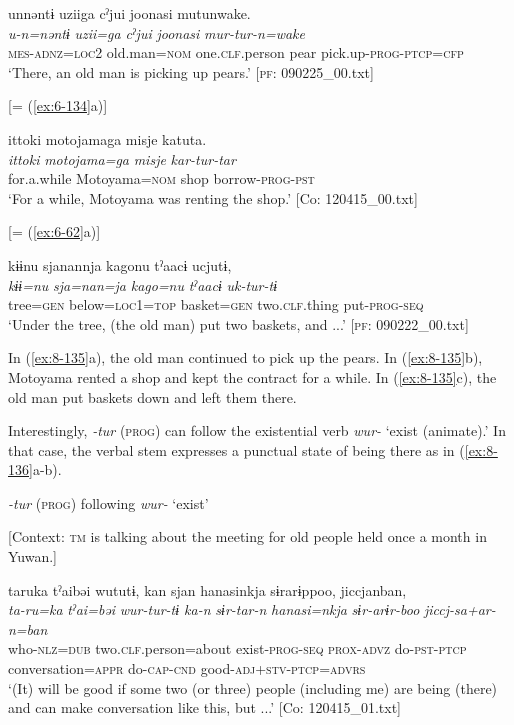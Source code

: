 \ea
{\TM}
\glll  unnəntɨ  uziiga  cˀjui  joonasi      mutunwake.\\
\textit{u-n=nəntɨ}  \textit{uzii=ga}  \textit{cˀjui}  \textit{joonasi}      \textit{mur-tur-n=wake}\\
\textsc{mes}-\textsc{adnz}=\textsc{loc}2  old.man=\textsc{nom}  one.\textsc{clf}.person  pear  pick.up-\textsc{prog}-\textsc{ptcp}=\textsc{cfp}\\
\glt ‘There, an old man is picking up pears.’ [\textsc{pf}: 090225\_00.txt]

\ex {}[= (\ref{ex:6-134}a)]

{\TM}
\glll  {\textbar}ittoki{\textbar}  motojamaga  misje  katuta.\\
\textit{ittoki}  \textit{motojama=ga}  \textit{misje}  \textit{kar-tur-tar}\\
for.a.while  Motoyama=\textsc{nom}  shop  borrow-\textsc{prog}-\textsc{pst}\\
\glt ‘For a while, Motoyama was renting the shop.’ [Co: 120415\_00.txt]

\ex {}[= (\ref{ex:6-62}a)]

{\TM}
\glll  kɨɨnu  sjanannja  kagonu  tˀaacɨ  ucjutɨ,\\
\textit{kɨɨ=nu}  \textit{sja=nan=ja}  \textit{kago=nu}  \textit{tˀaacɨ}  \textit{uk-tur-tɨ}\\
tree=\textsc{gen}  below=\textsc{loc1}=\textsc{top}  basket=\textsc{gen}  two.\textsc{clf}.thing  put-\textsc{prog}-\textsc{seq}\\
\glt ‘Under the tree, (the old man) put two baskets, and ...’ [\textsc{pf}: 090222\_00.txt]
\z
\z

In (\ref{ex:8-135}a), the old man continued to pick up the pears. In (\ref{ex:8-135}b), Motoyama rented a shop and kept the contract for a while. In (\ref{ex:8-135}c), the old man put baskets down and left them there.

  Interestingly, \textit{-tur} (\textsc{prog}) can follow the existential verb \textit{wur-} ‘exist (animate).’ In that case, the verbal stem expresses a punctual state of being there as in (\ref{ex:8-136}a-b).

\ea\label{ex:8-136}
  \textit{-tur} (\textsc{prog}) following \textit{wur-} ‘exist’

\ea {}[Context: \textsc{tm} is talking about the meeting for old people held once a month in Yuwan.]

{\TM}
\glll  taruka  tˀaibəi  wututɨ,  kan    sjan  hanasinkja  sɨrarɨppoo,  jiccjanban,\\
\textit{ta-ru=ka}  \textit{tˀai=bəi}  \textit{wur-tur-tɨ  ka-n}    \textit{sɨr-tar-n}  \textit{hanasi=nkja}  \textit{sɨr-arɨr-boo}  \textit{jiccj-sa+ar-n=ban}\\
who-\textsc{nlz}=\textsc{dub}  two.\textsc{clf}.person=about  exist-\textsc{prog}-\textsc{seq}  \textsc{prox}-\textsc{advz}  do-\textsc{pst}-\textsc{ptcp}  conversation=\textsc{appr}  do-\textsc{cap}-\textsc{cnd}  good-\textsc{adj}+\textsc{stv}-\textsc{ptcp}=\textsc{advrs}\\
\glt ‘(It) will be good if some two (or three) people (including me) are being (there) and can make conversation like this, but ...’ [Co: 120415\_01.txt]

